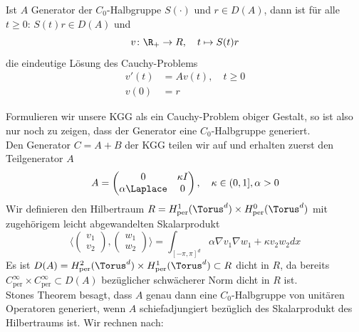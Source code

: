 \begin{maththeorem}
Ist $A$ Generator der $C_0$-Halbgruppe $S(\cdot)$ und $r\in D(A)$, dann ist für alle $t\ge 0\colon \,S(t)r\in D(A)$ und
\[v\colon \R_+\to R,\quad t\mapsto S(t)r\]
die eindeutige Lösung des Cauchy-Problems
\begin{equation}
\begin{split}
v'(t)&=Av(t),\quad t\ge 0\\
v(0)&=r
\end{split}
\end{equation}
\end{maththeorem}
Formulieren wir unsere KGG als ein Cauchy-Problem obiger Gestalt, so ist also nur noch zu zeigen, dass der Generator eine $C_0$-Halbgruppe generiert.\\
Den Generator $C=A+B$ der KGG teilen wir auf und erhalten zuerst den Teilgenerator $A$
\[A=\begin{pmatrix}0 & \kappa I\\ \alpha\Laplace & 0\end{pmatrix},\quad \kappa \in (0,1],\alpha>0\]
Wir definieren den Hilbertraum $R=H^1_\text{per}(\Torus^d)\times H^0_\text{per}(\Torus^d)$ mit zugehörigem leicht abgewandelten Skalarprodukt 
\[\langle \begin{pmatrix}v_1\\v_2\end{pmatrix}, \begin{pmatrix}w_1\\w_2\end{pmatrix}\rangle =\int_{[-\pi,\pi]^d}\alpha \nabla v_1\nabla w_1+\kappa v_2w_2dx\] 
Es ist $D(A)=H^2_\text{per}(\Torus^d)\times H^1_\text{per}(\Torus^d)\subset R$ dicht in $R$, da bereits $C_\text{per}^\infty\times C_\text{per}^\infty\subset D(A)$ bezüglicher schwächerer Norm dicht in $R$ ist.\\
Stones Theorem besagt, dass $A$ genau dann eine $C_0$-Halbgruppe von unitären Operatoren generiert, wenn $A$ schiefadjungiert bezüglich des Skalarprodukt des Hilbertraums ist. Wir rechnen nach:
